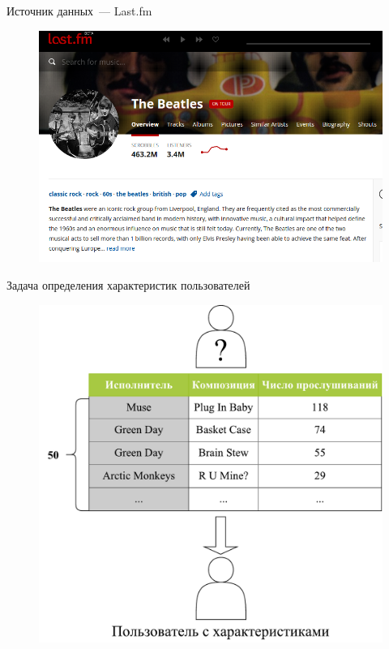 \documentclass{beamer}
\begin{document}
\begin{frame}{Источник данных~--- Last.fm}
    \begin{figure}
        \includegraphics[width=\textwidth]{figures/lastfm.png}
    \end{figure}
\end{frame}

\begin{frame}{Задача определения характеристик пользователей}
    \begin{figure}
        \includegraphics[scale=0.40]{figures/lastfm-top.pdf}
    \end{figure}
\end{frame}
\end{document}
